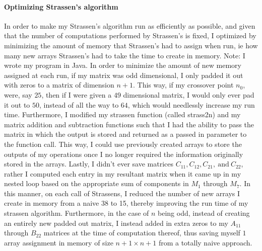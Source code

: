 \documentclass[10pt,letter]{article}
\begin{document}
\paragraph{ Optimizing Strassen's algorithm}
In order to make my Strassen's algorithm run as efficiently as possible, and given that the number of computations performed by Strassen's is fixed, I optimized by minimizing the amount of memory that Strassen's had to assign when run, ie how many new arrays Strassen's had to take the time to create in memory. Note: I wrote my program in Java. In order to minimize the amount of new memory assigned at each run, if my matrix was odd dimensional, I only padded it out with zeros to a matrix of dimension $n+1$. This way, if my crossover point $n_0$, were, say $25$, then if I were given a $49$ dimensional matrix, I would only ever pad it out to $50$, instead of all the way to $64$, which would needlessly increase my run time. Furthermore, I modified my strassen function (called strass2n) and my matrix addition and subtraction functions such that I had the ability to pass the matrix in which the output is stored and returned as a passed in parameter to the function call. This way, I could use previously created arrays to store the outputs of my operations once I no longer required the information originally stored in the arrays. Lastly, I didn't ever save matrices $C_{11}, C_{12}, C_{21}, \ \text{and} \ C_{22}$, rather I computed each entry in my resultant matrix when it came up in my nested loop based on the appropriate sum of components in $M_1$ through $M_7$. In this manner, on each call of Strassens, I reduced the number of new arrays I create in memory from a naive 38 to 15, thereby improving the run time of my strassen algorithm. Furthermore, in the case of $n$ being odd, instead of creating an entirely new padded out matrix, I instead added in extra zeros to my $A_{11}$ through $B_{22}$ matrices at the time of computation thereof, thus saving myself $1$ array assignment in memory of size $n+1\times n+1$ from a totally naive approach.
\end{document}

